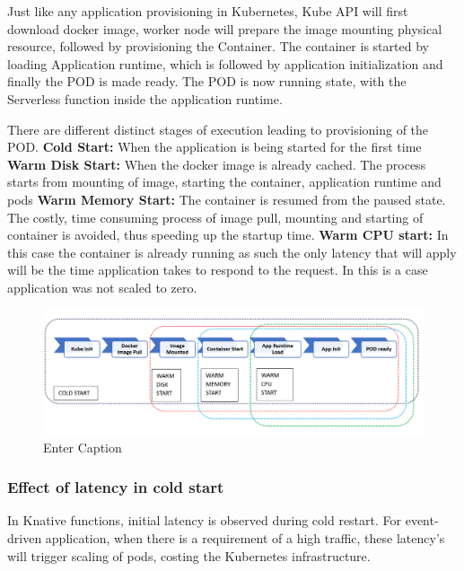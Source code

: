 \documentclass[12pt]{article}
\begin{document}
\begin{flushleft}
Just like any application provisioning in Kubernetes, Kube API will first download docker image, worker node will prepare the image mounting physical resource, followed by provisioning the Container. 
The container is started by loading Application runtime, which is followed by application initialization and finally the POD is made ready. The POD is now running state, with the Serverless function inside the application runtime. 

There are different distinct stages of execution leading to provisioning of the POD. 
\newline
\textbf{Cold Start:} When the application is being started for the first time
\newline
\textbf{Warm Disk Start:} When the docker image is already cached. The process starts from mounting of image, starting the container, application runtime and pods
\newline
\textbf{Warm Memory Start:} The container is resumed from the paused state. The costly, time consuming process of image pull, mounting and starting of container is avoided, thus speeding up the startup time.
\newline
\textbf{Warm CPU start:} In this case the container is already running as such the only latency that will apply will be the time application takes to respond to the request. In this is a case application was not scaled to zero.

\begin{figure}[h]
    \centering
    \includegraphics[width=1.0\linewidth]{images/Knative_lifecycle.PNG}
    \caption{Enter Caption}
    \label{fig:enter-label}
\end{figure}

\subsubsection{Effect of latency in cold start}
In Knative functions, initial latency is observed during cold restart. For event-driven application, when there is a requirement of a high traffic, these latency's will trigger scaling of pods, costing the Kubernetes infrastructure.  


\end{flushleft}
\end{document}
